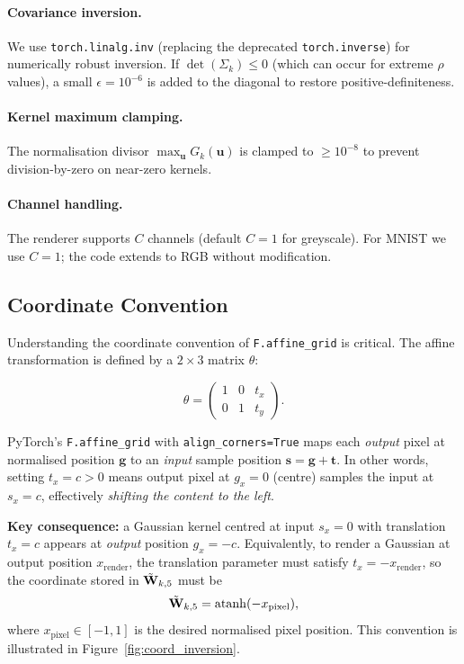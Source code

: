 \paragraph{Covariance inversion.}
We use \texttt{torch.linalg.inv} (replacing the deprecated \texttt{torch.inverse})
for numerically robust inversion.
If $\det(\Sigma_k) \leq 0$ (which can occur for extreme $\rho$ values), a small
$\epsilon = 10^{-6}$ is added to the diagonal to restore positive-definiteness.

\paragraph{Kernel maximum clamping.}
The normalisation divisor $\max_{\mathbf{u}} G_k(\mathbf{u})$ is clamped to
$\geq 10^{-8}$ to prevent division-by-zero on near-zero kernels.

\paragraph{Channel handling.}
The renderer supports $C$ channels (default $C=1$ for greyscale).
For MNIST we use $C=1$; the code extends to RGB without modification.

\subsection{Coordinate Convention}
\label{sec:coord_convention}

Understanding the coordinate convention of \texttt{F.affine\_grid} is critical.
The affine transformation is defined by a $2 \times 3$ matrix $\theta$:

\begin{equation}
  \theta =
  \begin{pmatrix}
    1 & 0 & t_x \\
    0 & 1 & t_y
  \end{pmatrix}.
  \label{eq:theta}
\end{equation}

\noindent PyTorch's \texttt{F.affine\_grid} with \texttt{align\_corners=True}
maps each \emph{output} pixel at normalised position $\mathbf{g}$ to an \emph{input}
sample position $\mathbf{s} = \mathbf{g} + \mathbf{t}$.
In other words, setting $t_x = c > 0$ means output pixel at $g_x = 0$ (centre)
samples the input at $s_x = c$, effectively \emph{shifting the content to the left}.

\medskip
\noindent
\textbf{Key consequence:} a Gaussian kernel centred at input $s_x = 0$ with
translation $t_x = c$ appears at \emph{output} position $g_x = -c$.
Equivalently, to render a Gaussian at output position $x_\text{render}$,
the translation parameter must satisfy $t_x = -x_\text{render}$,
so the coordinate stored in $\tilde{\mathbf{W}}_{k,5}$ must be
\begin{equation}
  \tilde{\mathbf{W}}_{k,5} = \operatorname{atanh}(-x_\text{pixel}),
  \label{eq:coord_fix}
\end{equation}
where $x_\text{pixel} \in [-1,1]$ is the desired normalised pixel position.
This convention is illustrated in Figure~\ref{fig:coord_inversion}.

